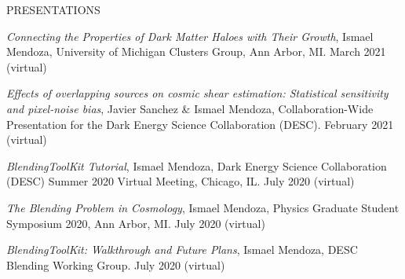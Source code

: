 \begin{rSection}{PRESENTATIONS}
\item \textit{Connecting the Properties of Dark Matter Haloes with Their Growth}, Ismael Mendoza, University of Michigan Clusters Group, Ann Arbor, MI. March 2021 (virtual)
%
\item \textit{Effects of overlapping sources on cosmic shear estimation: Statistical sensitivity and pixel-noise bias}, Javier Sanchez \& Ismael Mendoza, Collaboration-Wide Presentation for the Dark Energy Science Collaboration (DESC). February 2021 (virtual)
%
%
\item \textit{BlendingToolKit Tutorial}, Ismael Mendoza, Dark Energy Science Collaboration (DESC) Summer 2020 Virtual Meeting, Chicago, IL. July 2020 (virtual)
%
\item \textit{The Blending Problem in Cosmology}, Ismael Mendoza, Physics Graduate Student Symposium 2020, Ann Arbor, MI. July 2020 (virtual)
%
\item \textit{BlendingToolKit: Walkthrough and Future Plans}, Ismael Mendoza, DESC Blending Working Group. July 2020 (virtual)
\end{rSection}

